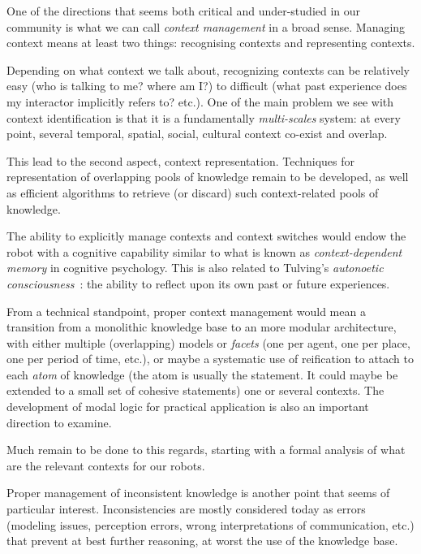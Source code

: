 One of the directions that seems both critical and under-studied in our
community is what we can call \emph{context management} in a broad sense.
Managing context means at least two things: recognising contexts and
representing contexts.

Depending on what context we talk about, recognizing contexts can be relatively
easy (who is talking to me? where am I?) to difficult (what past experience
does my interactor implicitly refers to? etc.). One of the main problem we see
with context identification is that it is a fundamentally \emph{multi-scales}
system: at every point, several temporal, spatial, social, cultural context
co-exist and overlap.

This lead to the second aspect, context representation. Techniques for
representation of overlapping pools of knowledge remain to be developed, as
well as efficient algorithms to retrieve (or discard) such context-related
pools of knowledge.

The ability to explicitly manage contexts and context switches would endow the
robot with a cognitive capability similar to what is known as
\emph{context-dependent memory} in cognitive psychology. This is also related to
Tulving's \emph{autonoetic consciousness}~\cite{Tulving1985a}: the ability to
reflect upon its own past or future experiences.

From a technical standpoint, proper context management would mean a transition
from a monolithic knowledge base to an more modular architecture, with either
multiple (overlapping) models or \emph{facets} (one per agent, one per place,
one per period of time, etc.), or maybe a systematic use of reification to
attach to each \emph{atom} of knowledge (the atom is usually the statement. It
could maybe be extended to a small set of cohesive statements) one or several
contexts. The development of modal logic for practical application is also an
important direction to examine.

Much remain to be done to this regards, starting with a formal analysis of what
are the relevant contexts for our robots.

\par

Proper management of inconsistent knowledge is another point that seems of
particular interest. Inconsistencies are mostly considered today as errors
(modeling issues, perception errors, wrong interpretations of communication, etc.)
that prevent at best further reasoning, at worst the use of the knowledge base.

